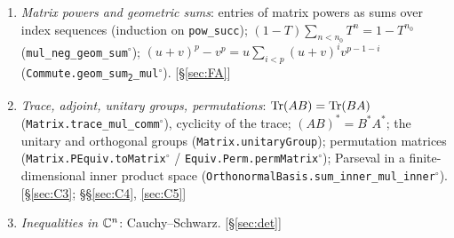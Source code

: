 \begin{enumerate}[leftmargin=2em,itemsep=1pt]
(\texttt{Matrix.det\_fromBlocks\textsubscript{22}}, \texttt{Matrix.det\_fromBlocks\textsubscript{11}}); invariance of inverse and determinant under reindexing
(\texttt{Matrix.det\_submatrix\_equiv\_self}$^\circ$, \texttt{Matrix.inv\_submatrix\_equiv}$^\circ$). Both block formulas are also proved in Step~0 of the proof of Lemma~\ref{lem:schur} from the determinant
of block triangular matrices. \hfill[\S\ref{sec:det}; \S\ref{sec:FA} (through Lemma~\ref{lem:schur}); \S\ref{sec:edge}]
\item \emph{Matrix powers and geometric sums}: entries of matrix powers as sums over index sequences (induction on \texttt{pow\_succ}); $(1-T)\sum_{n<n_0}T^n=1-T^{n_0}$ (\texttt{mul\_neg\_geom\_sum}$^\circ$);
$(u+v)^p-v^p=u\sum_{i<p}(u+v)^iv^{p-1-i}$ (\texttt{Commute.geom\_sum\textsubscript{2}\_mul}$^\circ$). \hfill[\S\ref{sec:FA}]
\item \emph{Trace, adjoint, unitary groups, permutations}: $\operatorname{Tr}(AB)=\operatorname{Tr}(BA)$ (\texttt{Matrix.trace\_mul\_comm}$^\circ$), cyclicity of the trace; $(AB)^*=B^*A^*$; the unitary and orthogonal groups
(\texttt{Matrix.unitaryGroup}); permutation matrices (\texttt{Matrix.PEquiv.toMatrix}$^\circ$ / \texttt{Equiv.Perm.permMatrix}$^\circ$); Parseval in a finite-dimensional inner product space
(\texttt{OrthonormalBasis.sum\_inner\_mul\_inner}$^\circ$). \hfill[\S\ref{sec:C3}; \S\S\ref{sec:C4}, \ref{sec:C5}]
\item \emph{Inequalities in $\mathbb{C}^n$}: Cauchy--Schwarz. \hfill[\S\ref{sec:det}]
\end{enumerate}

